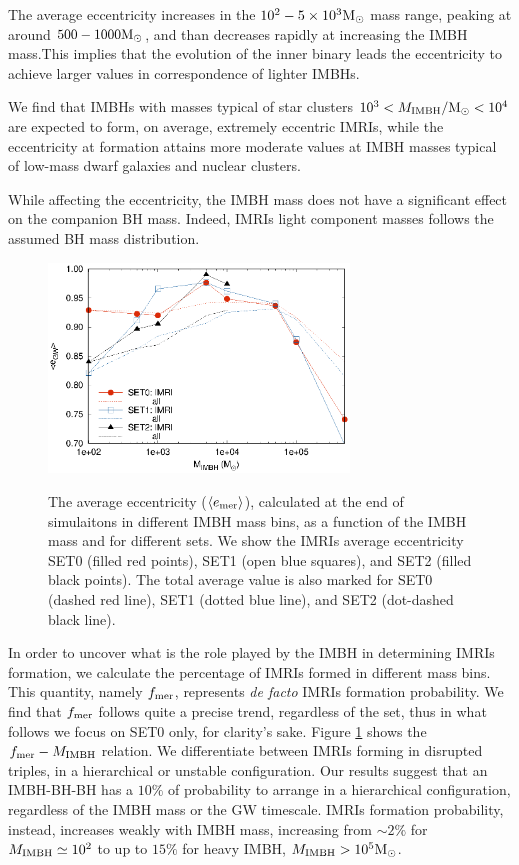 \documentclass[useAMS,usenatbib]{mn2e}
\newcommand{\Ms}{{\rm M}_\odot}
\newcommand{\ibh}{{\rm IMBH}}
\begin{document}
The average eccentricity increases in the $10^2-5\times10^3\Ms$ mass range, peaking at around $500-1000\Ms$, and than decreases rapidly at increasing the IMBH mass.This implies that the evolution of the inner binary leads the eccentricity to achieve larger values in correspondence of lighter IMBHs. 

We find that IMBHs with masses typical of star clusters $10^3<M_\ibh/\Ms<10^4$ are expected to form, on average, extremely eccentric IMRIs, while the eccentricity at formation attains more moderate values at IMBH masses typical of low-mass dwarf galaxies and nuclear clusters.

While affecting the eccentricity, the IMBH mass does not have a significant effect on the companion BH mass. Indeed, IMRIs light component masses follows the assumed BH mass distribution. 

\begin{figure}
\centering
\includegraphics[width=8cm]{average_ecc_sets}\\
\caption{The average eccentricity ($\langle e_{\rm mer}\rangle$), calculated at the end of simulaitons in different IMBH mass bins, as a function of the IMBH mass and for different sets. We show the IMRIs average eccentricity SET0 (filled red points), SET1 (open blue squares), and SET2 (filled black points). The total average value is also marked for SET0 (dashed red line), SET1 (dotted blue line), and SET2 (dot-dashed black line). }
\label{fig:f5}
\end{figure}

In order to uncover what is the role played by the IMBH in determining IMRIs formation, we calculate the 
percentage of IMRIs formed in different mass bins. This quantity, namely $f_{\rm mer}$, represents {\it de facto} IMRIs formation probability. We find that $f_{\rm mer}$ follows quite a precise trend, regardless of the set, thus in what follows we focus on SET0 only, for clarity's sake. Figure \ref{fig:f5} shows the $f_{\rm mer}-M_\ibh$ relation. We differentiate between IMRIs forming in disrupted triples, in a hierarchical or unstable configuration. 
Our results suggest that an IMBH-BH-BH has a $10\%$ of probability to arrange in a hierarchical configuration, regardless of the IMBH mass or the GW timescale. IMRIs formation probability, instead, increases weakly with IMBH mass, increasing from $\sim 2\%$ for $M_\ibh \simeq 10^2$ to up to $15\%$ for heavy IMBH, $M_\ibh>10^5\Ms$.
\end{document}
